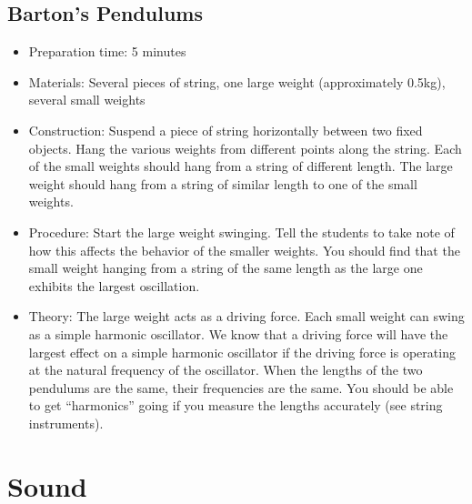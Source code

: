 \subsection{Barton’s Pendulums}
\begin{itemize}
\item{Preparation time: 5 minutes}
\item{Materials: Several pieces of string, one large weight (approximately 0.5kg), several small weights}
\item{Construction: Suspend a piece of string horizontally between two fixed objects. Hang the various weights from different points along the string. Each of the small weights should hang from a string of different length. The large weight should hang from a string of similar length to one of the small weights.}
\item{Procedure: Start the large weight swinging. Tell the students to take note of how this affects the behavior of the smaller weights. You should find that the small weight hanging from a string of the same length as the large one exhibits the largest oscillation.}
\item{Theory: The large weight acts as a driving force. Each small weight can swing as a simple harmonic oscillator. We know that a driving force will have the largest effect on a simple harmonic oscillator if the driving force is operating at the natural frequency of the oscillator. When the lengths of the two pendulums are the same, their frequencies are the same. You should be able to get “harmonics” going if you measure the lengths accurately (see string instruments).}
\end{itemize}

\section{Sound}

